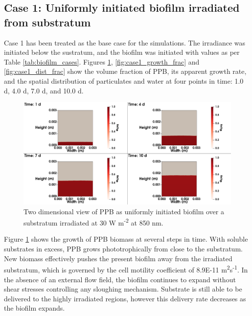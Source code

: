 \subsection{Case 1: Uniformly initiated biofilm irradiated from substratum}
Case 1 has been treated as the base case for the simulations. The irradiance was initiated below the sustratum, and the biofilm was initiated with values as per Table \ref{tab:biofilm_cases}. Figures \ref{fig:case1_ppb_frac}, \ref{fig:case1_growth_frac} and \ref{fig:case1_dist_frac} show the volume fraction of PPB, its apparent growth rate, and the spatial distribution of particulates and water at four points in time: 1.0 d, 4.0 d, 7.0 d, and 10.0 d. 
\begin{figure}[H]
    \centering
     \hspace*{-1cm}\includegraphics[width=1.1\textwidth,height=0.4\textheight]{Chap4/methods/data/figures/case1_ppb_frac.png}
    \caption{Two dimensional view of PPB as uniformly initiated biofilm over a substratum irradiated at 30 W m\textsuperscript{-2} at 850 nm.} 
    \label{fig:case1_ppb_frac}
\end{figure}

Figure \ref{fig:case1_ppb_frac} shows the growth of PPB biomass at several steps in time. With soluble substrates in excess, PPB grows phototrophically from close to the substratum. New biomass effectively pushes the present biofilm away from the irradiated substratum, which is governed by the cell motility coefficient of \num{8.9E-11} m\textsuperscript{2}s\textsuperscript{-1}. In the absence of an external flow field, the biofilm continues to expand without shear stresses controlling any sloughing mechanism. Substrate is still able to be delivered to the highly irradiated regions, however this delivery rate decreases as the biofilm expands. 


